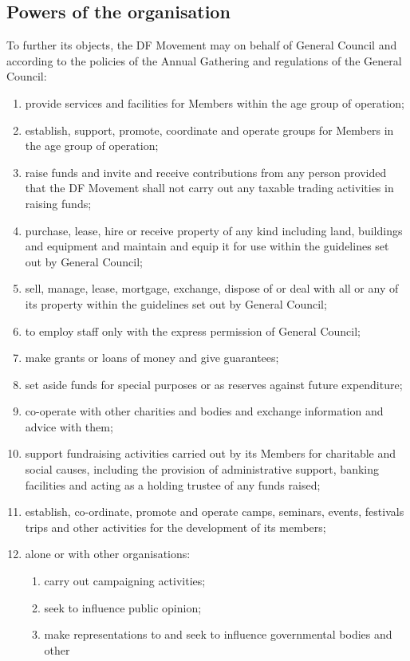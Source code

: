 \documentclass[a4paper, 12pt]{report}
\begin{document}
\subsection{Powers of the organisation}
To further its objects, the DF Movement may on behalf of General Council and according to the policies of the Annual Gathering and regulations of the General Council:
\begin{enumerate}
\item provide services and facilities for Members within the age group of operation;
\item establish, support, promote, coordinate and operate groups for Members in the age group of operation;
\item raise funds and invite and receive contributions from any person provided that the DF Movement shall not carry out any taxable trading activities in raising funds;
\item purchase, lease, hire or receive property of any kind including land, buildings and equipment and maintain and equip it for use within the guidelines set out by General Council;
\item sell, manage, lease, mortgage, exchange, dispose of or deal with all or any of its property within the guidelines set out by General Council;
\item to employ staff only with the express permission of General Council;
\item make grants or loans of money and give guarantees;
\item set aside funds for special purposes or as reserves against future expenditure;
\item co-operate with other charities and bodies and exchange information and advice with them;
\item support fundraising activities carried out by its Members for charitable and social causes, including the provision of administrative support, banking facilities and acting as a holding trustee of any funds raised;
\item establish, co-ordinate, promote and operate camps, seminars, events, festivals trips and other activities for the development of its members;
\item alone or with other organisations:
\begin{enumerate}
\item carry out campaigning activities;
\item seek to influence public opinion;
\item make representations to and seek to influence governmental bodies and other

\end{enumerate}
\end{enumerate}
\end{document}
